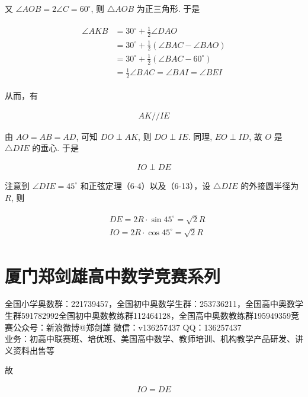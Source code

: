 \documentclass[10pt]{article}
\begin{document}
又 $\angle A O B=2 \angle C=60^{\circ}$, 则 $\triangle A O B$ 为正三角形. 于是

\begin{align*}
\begin{aligned}
\angle A K B & =30^{\circ}+\frac{1}{2} \angle D A O \\
& =30^{\circ}+\frac{1}{2}(\angle B A C-\angle B A O) \\
& =30^{\circ}+\frac{1}{2}\left(\angle B A C-60^{\circ}\right) \\
& =\frac{1}{2} \angle B A C=\angle B A I=\angle B E I
\end{aligned}
\end{align*}

从而，有

\begin{align*}
A K / / I E
\end{align*}

由 $A O=A B=A D$, 可知 $D O \perp A K$, 则 $D O \perp I E$. 同理, $E O \perp I D$, 故 $O$ 是 $\triangle D I E$ 的垂心. 于是

\begin{align*}
I O \perp D E
\end{align*}

注意到 $\angle D I E=45^{\circ}$ 和正弦定理（6-4）以及（6-13），设 $\triangle D I E$ 的外接圆半径为 $R$, 则

\begin{align*}
\begin{aligned}
& D E=2 R \cdot \sin 45^{\circ}=\sqrt{2} R \\
& I O=2 R \cdot \cos 45^{\circ}=\sqrt{2} R
\end{aligned}
\end{align*}

\section*{厦门郑剑雄高中数学竞赛系列}
全国小学奥数群：221739457，全国初中奥数学生群：253736211，全国高中奥数学生群591782992全国初中奥数教练群112464128，全国高中奥数教练群195949359竞赛公众号：新浪微博@郑剑雄 微信：v136257437 QQ：136257437\\
业务：初高中联赛班、培优班、美国高中数学、教师培训、机构教学产品研发、讲义资料出售等

故

\begin{align*}
I O=D E
\end{align*}
\end{document}
